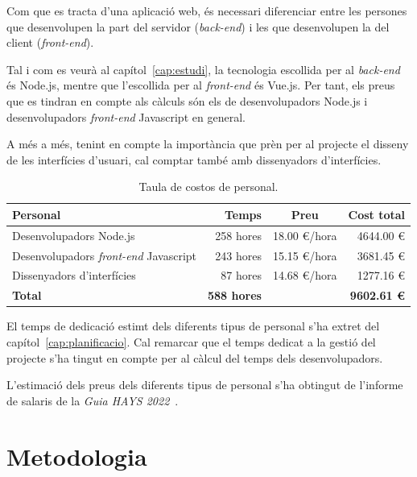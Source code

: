 \documentclass[a4paper,12pt]{ThesisStyle}
\begin{document}
Com que es tracta d'una aplicació web, és necessari diferenciar entre les persones que desenvolupen la part del servidor (\textit{back-end}) i les que desenvolupen la del client (\textit{front-end}).

Tal i com es veurà al capítol~\ref{cap:estudi}, la tecnologia escollida per al \textit{back-end} és Node.js, mentre que l'escollida per al \textit{front-end} és Vue.js. Per tant, els preus que es tindran en compte als càlculs són els de desenvolupadors Node.js i desenvolupadors \textit{front-end} Javascript en general.

A més a més, tenint en compte la importància que prèn per al projecte el disseny de les interfícies d'usuari, cal comptar també amb dissenyadors d'interfícies.

\begin{table}[H]
  \begin{tabularx}{\textwidth}{X  r  c  r}
    \toprule
    \rowcolor{TblDef}
    \textbf{Personal}                               & \textbf{Temps}      & \textbf{Preu}   & \textbf{Cost total}\\
    \midrule[0.9pt]
    Desenvolupadors Node.js                         & 258 hores           & 18.00 €/hora    & 4644.00 € \\
    \midrule
    Desenvolupadors \textit{front-end} Javascript   & 243 hores           & 15.15 €/hora    & 3681.45 € \\
    \midrule
    Dissenyadors d'interfícies                      & 87 hores            & 14.68 €/hora    & 1277.16 € \\
    \midrule[0.9pt]
    \textbf{Total}                                  & \textbf{588 hores}  &                 & \textbf{9602.61 €} \\
    \bottomrule
  \end{tabularx}
  \caption{\label{taula:costos_personal} Taula de costos de personal.}
\end{table}

El temps de dedicació estimt dels diferents tipus de personal s'ha extret del capítol~\ref{cap:planificacio}. Cal remarcar que el temps dedicat a la gestió del projecte s'ha tingut en compte per al càlcul del temps dels desenvolupadors.

L'estimació dels preus dels diferents tipus de personal s'ha obtingut de l'informe de salaris de la \emph{Guia HAYS 2022}~\cite{Hays}.

\chapter{Metodologia}
\label{cap:metodologia}
\end{document}
